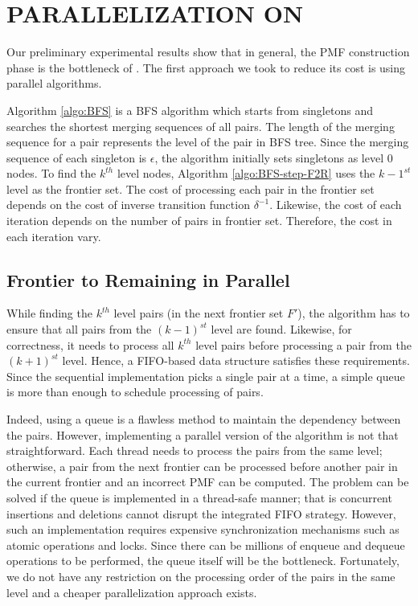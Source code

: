 \chapter{PARALLELIZATION ON \greedyAlgo}
\label{sec:parallel}

Our preliminary experimental results show that in general, the PMF construction phase is the bottleneck of \greedyAlgo. The first approach we took to reduce its cost is using parallel algorithms. 

Algorithm \ref{algo:BFS} is a BFS algorithm which starts from singletons and searches the shortest merging sequences of all pairs. The length of the merging sequence for a pair represents the level of the pair in BFS tree. Since the merging sequence of each singleton is $\epsilon$, the algorithm initially sets singletons as level 0 nodes. To find the $k^{th}$ level nodes, Algorithm \ref{algo:BFS-step-F2R} uses the $k-1^{st}$ level as the frontier set. The cost of processing each pair in the frontier set depends on the cost of inverse transition function $\delta^{-1}$. Likewise, the cost of each iteration depends on the number of pairs in frontier set. Therefore, the cost in each iteration vary.

\section{Frontier to Remaining in Parallel}
\label{sec:BFS-F2R-parallel}

While finding the $k^{th}$ level pairs (in the next frontier set $F'$), the algorithm has to ensure that all pairs from the $(k-1)^{st}$ level are found. Likewise, for correctness, it needs to process all $k^{th}$ level pairs before processing a pair from the $(k+1)^{st}$ level. Hence, a FIFO-based data structure satisfies these requirements. Since the sequential implementation picks a single pair at a time, a simple queue is more than enough to schedule processing of pairs. 

Indeed, using a queue is a flawless method to maintain the dependency between the pairs. However, implementing a parallel version of the algorithm is not that straightforward. Each thread needs to process the pairs from the same level; otherwise, a pair from the next frontier can be processed before another pair in the current frontier and an incorrect PMF can be computed. The problem can be solved if the queue is implemented in a thread-safe manner; that is concurrent insertions and deletions cannot disrupt the integrated FIFO strategy. However, such an implementation requires expensive synchronization mechanisms such as atomic operations and locks. Since there can be millions of enqueue and dequeue operations to be performed, the queue itself will be the bottleneck. Fortunately, we do not have any restriction on the processing order of the pairs in the same level and a cheaper parallelization approach exists.  

